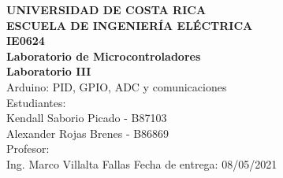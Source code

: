 \documentclass[12pt,letterpaper]{article}
\begin{document}
\begin{titlepage}
\begin{center}
\textbf{UNIVERSIDAD DE COSTA RICA}\\ 
\vspace{6mm}
\textbf{ESCUELA DE INGENIERÍA ELÉCTRICA}\\
\vspace{3cm}
\textbf{IE0624}\\
\textbf{Laboratorio de Microcontroladores}\\
\vspace{3cm}
\textbf{Laboratorio III}\\
\vspace{0.5cm}
Arduino: PID, GPIO, ADC y comunicaciones\\
\vspace{3cm}
Estudiantes:\\
Kendall Saborio Picado - B87103\\
Alexander Rojas Brenes - B86869\\
\vspace{1.5cm}
Profesor:\\
Ing. Marco Villalta Fallas
\vfill
Fecha de entrega: 08/05/2021
\end{center}
\end{titlepage}

\tableofcontents












\end{document}
